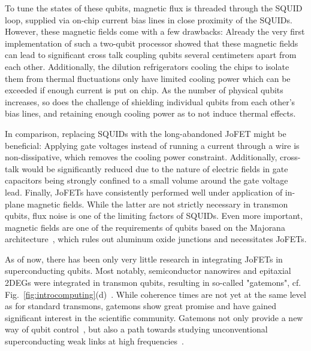 To tune the states of these qubits, magnetic flux is threaded through the SQUID loop, supplied via on-chip current bias lines in close proximity of the SQUIDs.
%
However, these magnetic fields come with a few drawbacks:
%
Already the very first implementation of such a two-qubit processor showed that these magnetic fields can lead to significant cross talk coupling qubits several centimeters apart from each other\cite{dicarloDemonstrationTwoqubitAlgorithms2009}.
%
Additionally, the dilution refrigerators cooling the chips to isolate them from thermal fluctuations only have limited cooling power which can be exceeded if enough current is put on chip.
%
As the number of physical qubits increases, so does the challenge of shielding individual qubits from each other's bias lines, and retaining enough cooling power as to not induce thermal effects.

In comparison, replacing SQUIDs with the long-abandoned JoFET might be beneficial:
%
Applying gate voltages instead of running a current through a wire is non-dissipative, which removes the cooling power constraint.
%
Additionally, cross-talk would be significantly reduced due to the nature of electric fields in gate capacitors being strongly confined to a small volume around the gate voltage lead.
%
Finally, JoFETs have consistently performed well under application of in-plane magnetic fields.
%
While the latter are not strictly necessary in transmon qubits, flux noise is one of the limiting factors of SQUIDs.
%
Even more important, magnetic fields are one of the requirements of qubits based on the Majorana architecture~\cite{hyartFluxcontrolledQuantumComputation2013}, which rules out aluminum oxide junctions and necessitates JoFETs.


As of now, there has been only very little research in integrating JoFETs in superconducting qubits.
%
Most notably, semiconductor nanowires and epitaxial 2DEGs were integrated in transmon qubits, resulting in so-called "gatemons", cf. Fig.~\ref{fig:introcomputing}(d)~\cite{delangeRealizationMicrowaveQuantum2015,larsenSemiconductorNanowireBasedSuperconductingQubit2015,casparisGatemonBenchmarkingTwoQubit2016a,casparisSuperconductingGatemonQubit2018,luthiEvolutionNanowireTransmon2018}.
%
While coherence times are not yet at the same level as for standard transmons, gatemons show great promise and have gained significant interest in the scientific community.
%
Gatemons not only provide a new way of qubit control~\cite{shimSemiconductorinspiredDesignPrinciples2016}, but also a path towards studying unconventional superconducting weak links at high frequencies~\cite{tahanGrapheneQubitMotivates2019}.



